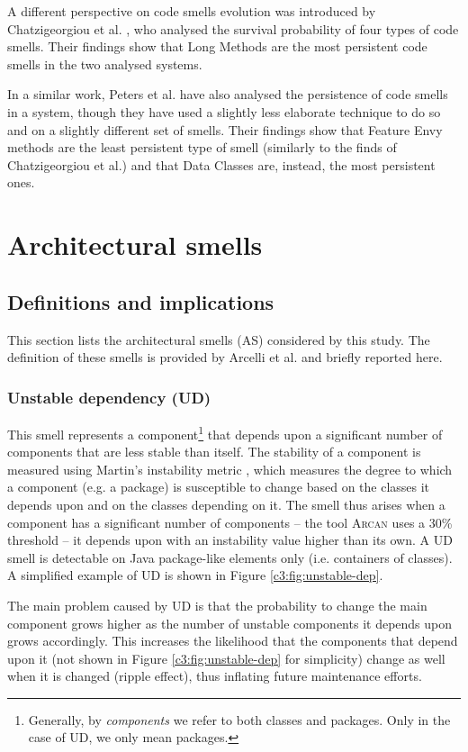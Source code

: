 A different perspective on code smells evolution was introduced by Chatzigeorgiou et al. \cite{Chatzigeorgiou2014}, who analysed the survival probability of four types of code smells. Their findings show that Long Methods are the most persistent code smells in the two analysed systems.

In a similar work, Peters et al. \cite{Peters2012} have also analysed the persistence of code smells in a system, though they have used a slightly less elaborate technique to do so and on a slightly different set of smells.
Their findings show that Feature Envy methods are the least persistent type of smell (similarly to the finds of Chatzigeorgiou et al.) and that Data Classes are, instead, the most persistent ones.

\section{Architectural smells}\label{c3:sec:arch-smells}
\subsection{Definitions and implications}
This section lists the architectural smells (AS) considered by this study. The definition of these smells is provided by Arcelli et al. \cite{Arcelli2016} and briefly reported here.
\subsubsection{Unstable dependency (UD)}\label{c3:sec:arch-smells-ud}
This smell represents a component\footnote{Generally, by \emph{components} we refer to both classes and packages. Only in the case of UD, we only mean packages.} that depends upon a significant number of components that are less stable than itself.
The stability of a component is measured using Martin's instability metric \cite{Martin2018}, which measures the degree to which a component (e.g. a package) is susceptible to change based on the classes it depends upon and on the classes depending on it.
The smell thus arises when a component has a significant number of components -- the tool \textsc{Arcan} uses a 30\% threshold \cite{Arcelli2017} -- it depends upon with an instability value higher than its own.
A UD smell is detectable on Java package-like elements only (i.e. containers of classes). A simplified example of UD is shown in Figure \ref{c3:fig:unstable-dep}. 

The main problem caused by UD is that the probability to change the main component grows higher as the number of unstable components it depends upon grows accordingly. This increases the likelihood that the components that depend upon it (not shown in Figure \ref{c3:fig:unstable-dep} for simplicity) change as well when it is changed (ripple effect), thus inflating future maintenance efforts.

